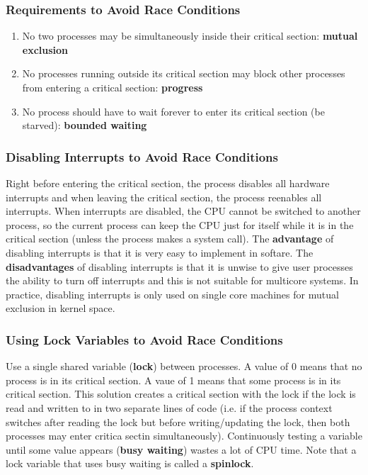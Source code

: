 \documentclass{article}
\newcommand{\bold}[1]{\textbf{#1}}
\renewcommand{\b}{\item[$\circ$]}
\begin{document}
    \subsubsection{Requirements to Avoid Race Conditions}

    \begin{enumerate}
    \b No two processes may be simultaneously inside their critical section: \bold{mutual exclusion}
    \b No processes running outside its critical section may block other processes from entering a critical section: \bold{progress}
    \b No process should have to wait forever to enter its critical section (be starved): \bold{bounded waiting}
    \end{enumerate}

    \subsubsection{Disabling Interrupts to Avoid Race Conditions}
    
    Right before entering the critical section, the process disables all hardware interrupts and when leaving the critical section, the process reenables all interrupts. When interrupts are disabled, the CPU cannot be switched to another process, so the current process can keep the CPU just for itself while it is in the critical section (unless the process makes a system call). The \bold{advantage} of disabling interrupts is that it is very easy to implement in softare. The \bold{disadvantages} of disabling interrupts is that it is unwise to give user processes the ability to turn off interrupts and this is not suitable for multicore systems. In practice, disabling interrupts is only used on single core machines for mutual exclusion in kernel space. 
    
    \subsubsection{Using Lock Variables to Avoid Race Conditions}

    Use a single shared variable (\bold{lock}) between processes. A value of 0 means that no process is in its critical section. A vaue of 1 means that some process is in its critical section. This solution creates a critical section with the lock if the lock is read and written to in two separate lines of code (i.e. if the process context switches after reading the lock but before writing/updating the lock, then both processes may enter critica sectin simultaneously). Continuously testing a variable until some value appears (\bold{busy waiting}) wastes a lot of CPU time. Note that a lock variable that uses busy waiting is called a \bold{spinlock}. 
\end{document}
